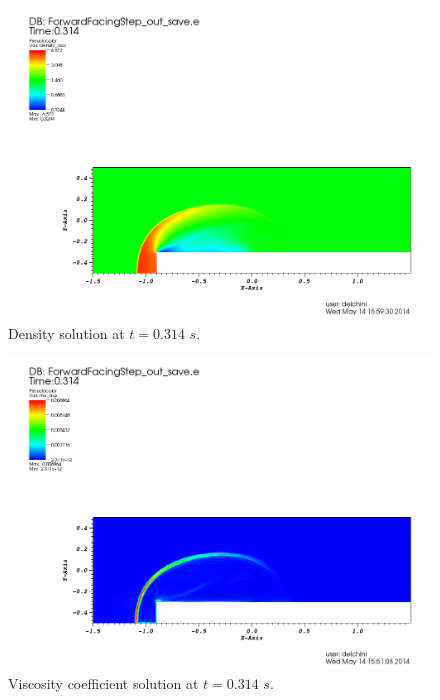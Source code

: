 \begin{figure}[H]
\centering
\includegraphics[scale=.50]{figures/FFSDensityEqualTo0p314.png}
\caption{Density solution at $t=0.314$ $s$.}
\label{fig:2d_ffs_rho_0314}
\end{figure}
%
\begin{figure}[H]
\centering
\includegraphics[scale=.50]{figures/FFSVisctEqualTo0p314.png}
\caption{Viscosity coefficient solution at $t=0.314$ $s$.}
\label{fig:2d_ffs_visc_0314}
\end{figure}
%
